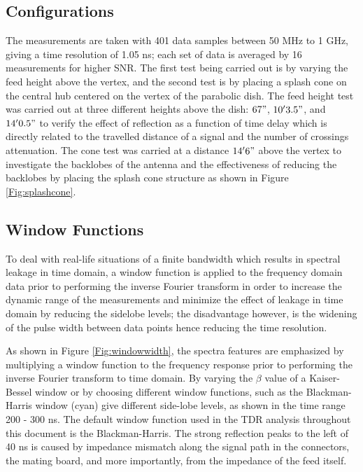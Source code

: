 \documentclass[preprint]{aastex}  %
\begin{document}
\subsection{Configurations}
The measurements are taken with 401 data samples between 50 MHz to 1 GHz, giving a time resolution of 1.05 ns; each set of data is averaged by 16 measurements for higher SNR. The first test being carried out is by varying the feed height above the vertex, and the second test is by placing a splash cone on the central hub centered on the vertex of the parabolic dish. The feed height test was carried out at three different heights above the dish: $67"$, $10'3.5"$, and $14'0.5"$ to verify the effect of reflection as a function of time delay which is directly related to the travelled distance of a signal and the number of crossings attenuation. The cone test was carried at a distance $14' 6"$ above the vertex to investigate the backlobes of the antenna and the effectiveness of reducing the backlobes by placing the splash cone structure as shown in Figure \ref{Fig:splashcone}.

\subsection{Window Functions}
To deal with real-life situations of a finite bandwidth which results in 
spectral leakage in time domain, a window function is applied to the frequency domain data 
prior to performing the inverse Fourier 
transform in order to increase the dynamic range of the measurements and minimize the effect of leakage in time 
domain by reducing the sidelobe levels; the disadvantage however, is the 
widening of the pulse width between data points hence reducing the time 
resolution. 

As shown in Figure \ref{Fig:windowwidth}, the spectra features are 
emphasized by multiplying a window function to the frequency response prior to 
performing the inverse Fourier transform to time domain. By varying the $\beta$ value of a 
Kaiser-Bessel window or by choosing different window functions, such as the Blackman-Harris 
window (cyan) give different side-lobe levels, as shown in the time range 200 - 300 ns. The  
default window function used in the TDR 
analysis throughout this document is the Blackman-Harris. The 
strong reflection peaks to the left of 
40 ns is caused by impedance 
mismatch along the signal path in the connectors, the mating board, and more 
importantly, from the impedance of the feed itself. 
\end{document}
